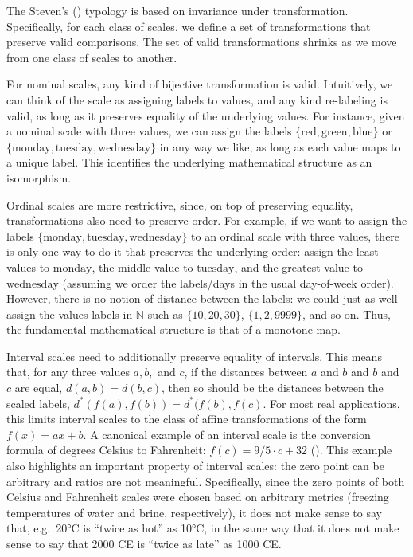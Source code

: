 \documentclass[
]{book}
\begin{document}
The Steven's () typology is based on invariance under transformation. Specifically, for each class of scales, we define a set of transformations that preserve valid comparisons. The set of valid transformations shrinks as we move from one class of scales to another.

For nominal scales, any kind of bijective transformation is valid. Intuitively, we can think of the scale as assigning labels to values, and any kind re-labeling is valid, as long as it preserves equality of the underlying values. For instance, given a nominal scale with three values, we can assign the labels \(\{ \text{red}, \text{green}, \text{blue} \}\) or \(\{ \text{monday}, \text{tuesday}, \text{wednesday} \}\) in any way we like, as long as each value maps to a unique label. This identifies the underlying mathematical structure as an isomorphism.

Ordinal scales are more restrictive, since, on top of preserving equality, transformations also need to preserve order. For example, if we want to assign the labels \(\{ \text{monday}, \text{tuesday}, \text{wednesday} \}\) to an ordinal scale with three values, there is only one way to do it that preserves the underlying order: assign the least values to \(\text{monday}\), the middle value to \(\text{tuesday}\), and the greatest value to \(\text{wednesday}\) (assuming we order the labels/days in the usual day-of-week order). However, there is no notion of distance between the labels: we could just as well assign the values labels in \(\mathbb{N}\) such as \(\{ 10, 20, 30 \}\), \(\{1, 2, 9999 \}\), and so on. Thus, the fundamental mathematical structure is that of a monotone map.

Interval scales need to additionally preserve equality of intervals. This means that, for any three values \(a, b,\) and \(c\), if the distances between \(a\) and \(b\) and \(b\) and \(c\) are equal, \(d(a, b) = d(b, c)\), then so should be the distances between the scaled labels, \(d^*(f(a), f(b)) = d^*(f(b), f(c)\). For most real applications, this limits interval scales to the class of affine transformations of the form \(f(x) = ax + b\). A canonical example of an interval scale is the conversion formula of degrees Celsius to Fahrenheit: \(f(c) = 9/5 \cdot c + 32\) (). This example also highlights an important property of interval scales: the zero point can be arbitrary and ratios are not meaningful. Specifically, since the zero points of both Celsius and Fahrenheit scales were chosen based on arbitrary metrics (freezing temperatures of water and brine, respectively), it does not make sense to say that, e.g.~20°C is ``twice as hot'' as 10°C, in the same way that it does not make sense to say that 2000 CE is ``twice as late'' as 1000 CE.
\end{document}
